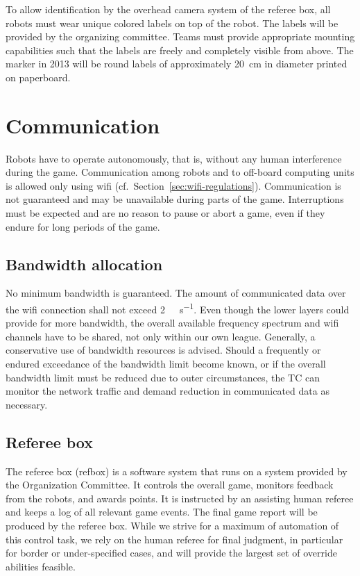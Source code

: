 \documentclass[12pt,twoside]{article}
\newcommand{\refsec}[1]{Section~\ref{#1}}
\begin{document}
To allow identification by the overhead camera system of the referee
box, all robots must wear unique colored labels on top of the
robot. The labels will be provided by the organizing committee. Teams
must provide appropriate mounting capabilities such that the labels
are freely and completely visible from above. The marker in 2013 will
be round labels of approximately \SI{20}{\centi\meter} in diameter
printed on paperboard.

\section{Communication}
\label{sec:communication}

Robots have to operate autonomously, that is, without any human
interference during the game. Communication among robots and to
off-board computing units is allowed only using wifi
(cf.~\refsec{sec:wifi-regulations}). Communication is not guaranteed
and may be unavailable during parts of the game. Interruptions must be
expected and are no reason to pause or abort a game, even if they
endure for long periods of the game.

\subsection{Bandwidth allocation}
\label{sec:bandwidth}
No minimum bandwidth is guaranteed. The amount of communicated data
over the wifi connection shall not exceed
\SI[per-mode=symbol]{2}{\mega\bit\per\second}. Even though the lower
layers could provide for more bandwidth, the overall available
frequency spectrum and wifi channels have to be shared, not only
within our own league. Generally, a conservative use of bandwidth
resources is advised. Should a frequently or endured exceedance of the
bandwidth limit become known, or if the overall bandwidth limit must
be reduced due to outer circumstances, the TC can monitor the network
traffic and demand reduction in communicated data as necessary.

\subsection{Referee box}
\label{sec:referee-box}
The referee box (refbox) is a software system that runs on a system
provided by the Organization Committee. It controls the overall game,
monitors feedback from the robots, and awards points. It is instructed
by an assisting human referee and keeps a log of all relevant game
events. The final game report will be produced by the referee
box. While we strive for a maximum of automation of this control task,
we rely on the human referee for final judgment, in particular for
border or under-specified cases, and will provide the largest set of
override abilities feasible.
\end{document}
